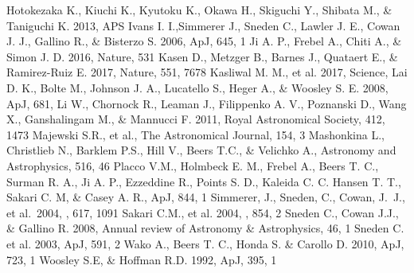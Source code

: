 \documentclass[a4paper,fleqn,usenatbib]{mnras}
\begin{document}
\begin{thebibliography}{99}
		Hotokezaka K., Kiuchi K., Kyutoku K., Okawa H., Skiguchi Y., Shibata M., \& Taniguchi K. 2013, APS
		Ivans I. I.,Simmerer J., Sneden C., Lawler J. E., Cowan J. J., Gallino R., \& Bisterzo S. 2006, ApJ, 645, 1
		Ji A. P., Frebel A., Chiti A., \& Simon J. D. 2016, Nature, 531
		Kasen D., Metzger B., Barnes J., Quataert E., \& Ramirez-Ruiz E. 2017, Nature, 551, 7678
		Kasliwal M. M., et al. 2017, Science,
		Lai D. K., Bolte M., Johnson J. A., Lucatello S., Heger A., \& Woosley S. E. 2008, ApJ, 681,
		Li W., Chornock R., Leaman J., Filippenko A. V., Poznanski D., Wang X., Ganshalingam M., \& Mannucci F. 2011, Royal Astronomical Society, 412, 1473
		Majewski S.R., et al., The Astronomical Journal, 154, 3
		Mashonkina L., Christlieb N., Barklem P.S., Hill V., Beers T.C., \& Velichko A., Astronomy and Astrophysics, 516, 46
		Placco V.M., Holmbeck E. M., Frebel A., Beers T. C., Surman R. A., Ji A. P., Ezzeddine R., Points S. D., Kaleida C. C. Hansen T. T., Sakari C. M, \& Casey A. R., ApJ, 844, 1
		 Simmerer, J., Sneden, C., Cowan, J.~J., et al.\ 2004, \apj, 617, 1091 
		 Sakari C.M., et al. 2004, \apj, 854, 2
		Sneden C., Cowan J.J., \& Gallino R. 2008, Annual review of Astronomy \& Astrophysics, 46, 1
		Sneden C. et al. 2003, ApJ, 591, 2
		Wako A., Beers T. C., Honda S. \& Carollo D. 2010, ApJ, 723, 1
		Woosley S.E, \& Hoffman R.D. 1992, ApJ, 395, 1
	\end{thebibliography}
	
\end{document}
